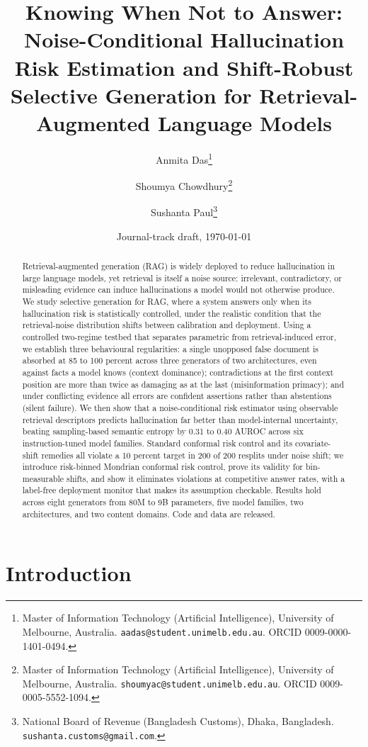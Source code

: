 \documentclass[11pt]{article}
\title{Knowing When Not to Answer: Noise-Conditional Hallucination Risk
Estimation and Shift-Robust Selective Generation for
Retrieval-Augmented Language Models}
\author{Anmita Das\thanks{Master of Information Technology
(Artificial Intelligence), University of Melbourne, Australia.
\texttt{aadas@student.unimelb.edu.au}. ORCID 0009-0000-1401-0494.} \and
Shoumya Chowdhury\thanks{Master of Information Technology
(Artificial Intelligence), University of Melbourne, Australia.
\texttt{shoumyac@student.unimelb.edu.au}. ORCID 0009-0005-5552-1094.} \and
Sushanta Paul\thanks{National Board of Revenue (Bangladesh Customs),
Dhaka, Bangladesh. \texttt{sushanta.customs@gmail.com}.}}
\date{Journal-track draft, \today}
\begin{document}
\maketitle

\begin{abstract}
Retrieval-augmented generation (RAG) is widely deployed to reduce
hallucination in large language models, yet retrieval is itself a noise
source: irrelevant, contradictory, or misleading evidence can induce
hallucinations a model would not otherwise produce. We study selective
generation for RAG, where a system answers only when its hallucination
risk is statistically controlled, under the realistic condition that the
retrieval-noise distribution shifts between calibration and deployment.
Using a controlled two-regime testbed that separates parametric from
retrieval-induced error, we establish three behavioural regularities: a
single unopposed false document is absorbed at 85 to 100 percent across
three generators of two architectures, even against facts a model knows
(context dominance); contradictions at the first context position are
more than twice as damaging as at the last (misinformation primacy); and
under conflicting evidence all errors are confident assertions rather
than abstentions (silent failure). We then show that a noise-conditional
risk estimator using observable retrieval descriptors predicts
hallucination far better than model-internal uncertainty, beating
sampling-based semantic entropy by 0.31 to 0.40 AUROC across six
instruction-tuned model families. Standard conformal risk control and its
covariate-shift remedies all violate a 10 percent target in 200 of 200
resplits under noise shift; we introduce risk-binned Mondrian conformal
risk control, prove its validity for bin-measurable shifts, and show it
eliminates violations at competitive answer rates, with a label-free
deployment monitor that makes its assumption checkable. Results hold
across eight generators from 80M to 9B parameters, five model families,
two architectures, and two content domains. Code and data are released.
\end{abstract}

\section{Introduction}\label{sec:intro}
\end{document}
